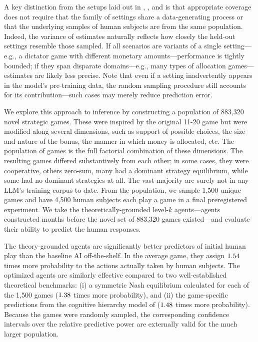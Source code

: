 \documentclass[11pt]{article}
\theoremstyle{definition}
\newcommand{\NGamesS}{1,500}
\newcommand{\NParticipantS}{4,500}
\newcommand{\TotalGames}{883,320}
\begin{document}
A key distinction from the setups laid out in \citeauthor{Hotz2005PredictingEfficacy}, \citeauthor{Allcott2015Site}, and \citeauthor{Dehejia2019External} is that appropriate coverage does not require that the family of settings share a data-generating process or that the underlying samples of human subjects are from the same population.
Indeed, the variance of estimates naturally reflects how closely the held-out settings resemble those sampled.  
If all scenarios are variants of a single setting---e.g., a dictator game with different monetary amounts---performance is tightly bounded; if they span disparate domains---e.g., many types of allocation games---estimates are likely less precise.
Note that even if a setting inadvertently appears in the model's pre-training data, the random sampling procedure still accounts for its contribution---such cases may merely reduce prediction error.

We explore this approach to inference by constructing a population of \TotalGames{} novel strategic games.
These were inspired by the original 11-20 game but were modified along several dimensions, such as support of possible choices, the size and nature of the bonus, the manner in which money is allocated, etc. 
The population of games is the full factorial combination of these dimensions.
The resulting games differed substantively from each other; in some cases, they were cooperative, others zero-sum, many had a dominant strategy equilibrium, while some had no dominant strategies at all.
The vast majority are surely not in any LLM's training corpus to date.
From the population, we sample \NGamesS{} unique games and have \NParticipantS{} human subjects each play a game in a final preregistered experiment.
We take the theoretically-grounded level-$k$ agents---agents constructed months before the novel set of \TotalGames{} games existed---and evaluate their ability to predict the human responses.

The theory-grounded agents are significantly better predictors of initial human play than the baseline AI off-the-shelf.
In the average game, they assign $1.54$ times more probability to the actions actually taken by human subjects.
The optimized agents are similarly effective compared to two well-established theoretical benchmarks: (i) a symmetric Nash equilibrium calculated for each of the 1,500 games ($1.38$ times more probability), and (ii) the game-specific predictions from the cognitive hierarchy model of \cite{Camerer2004Cognitive} ($1.48$ times more probability).
Because the games were randomly sampled, the corresponding confidence intervals over the relative predictive power are externally valid for the much larger population.
\end{document}
